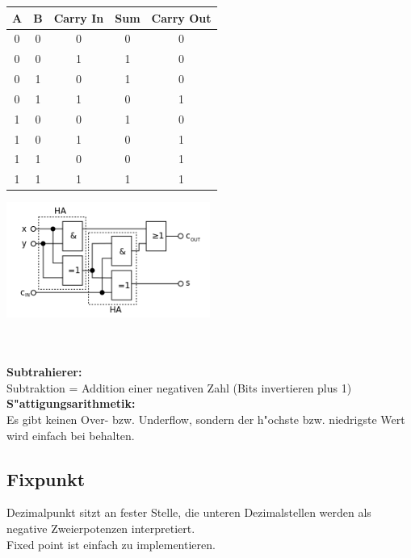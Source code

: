 \begin{minipage}{0.5\textwidth}
	\begin{tabular}{|c | c | c | c | c |}
	\hline
	A & B & Carry In & Sum & Carry Out\\
	\hline
	0 & 0 & 0 & 0 & 0\\
	\hline
	0 & 0 & 1 & 1 & 0\\
	\hline
	0 & 1 & 0 & 1 & 0\\
	\hline
	0 & 1 & 1 & 0 & 1\\
	\hline
	1 & 0 & 0 & 1 & 0\\
	\hline
	1 & 0 & 1 & 0 & 1\\
	\hline
	1 & 1 & 0 & 0 & 1\\
	\hline
	1 & 1 & 1 & 1 & 1\\
	\hline
	\end{tabular}
\end{minipage}
\begin{minipage}{0.9\textwidth}
	\begin{flushleft}
	{\includegraphics[width=0.5\textwidth]{images/Arithmetik/volladdierer.png}}
	\label{Fig: Volladdierer}
	\end{flushleft}
\end{minipage}\\ \\

\textbf{Subtrahierer:}\\
Subtraktion = Addition einer negativen Zahl (Bits invertieren plus 1)\\

\textbf{S"attigungsarithmetik:}\\
Es gibt keinen Over- bzw. Underflow, sondern der h"ochste bzw. niedrigste Wert wird einfach bei behalten.\\
\subsection{Fixpunkt}
Dezimalpunkt sitzt an fester Stelle, die unteren Dezimalstellen werden als negative Zweierpotenzen interpretiert. \\
Fixed point ist einfach zu implementieren. 
